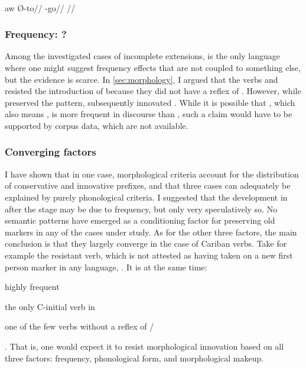 \yukpa \parencite[][139]{meira2006syntactic}\\
\begingl
\gla aw Ø-to//
\glb {} -go//
\glft {}//
\endgl
\xe


\subsubsection{Frequency: \bakairi?}
\label{sec:frequency}
Among the investigated cases of incomplete extensions, \bakairi is the only language where one might suggest frequency effects that are not coupled to something else, but the evidence is scarce.
In \cref{sec:morphology}, I argued that the \PPek verbs   and   resisted the introduction of  because they did not have a reflex of \detrz.
However, while \bakairi {}  preserved the \PPek pattern,   subsequently innovated .
While it is possible that , which also means  \parencite[105]{von1892bakairi}, is more frequent in \bakairi discourse than , such a claim would have to be supported by corpus data, which are not available.

\subsubsection{Converging factors}
\label{sec:convergence}
I have shown that in one case, morphological criteria account for the distribution of conservative and innovative prefixes, and that three cases can adequately be explained by purely phonological criteria.
I suggested that the development in \bakairi after the \PPek stage may be due to frequency, but only very speculatively so.
No semantic patterns have emerged as a conditioning factor for preserving old  markers in any of the cases under study.
As for the other three factors, the main conclusion is that they largely converge in the case of Cariban  verbs.
Take for example the  resistant verb, which is not attested as having taken on a new first person marker in any language,  .
It is at the same time: \begin{inlinelist}
	\item highly frequent
	\item the only C-initial  verb in \PC
	\item one of the few  verbs without a reflex of /
\end{inlinelist}.
That is, one would expect it to resist morphological innovation based on all three factors: frequency, phonological form, and morphological makeup.

